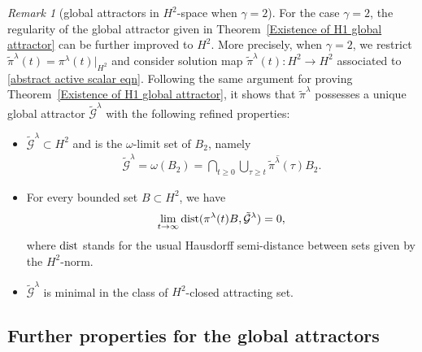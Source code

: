 \documentclass[reqno]{amsart}%
\theoremstyle{definition}
\theoremstyle{remark}
\numberwithin{equation}{section}
\newtheorem{remark}[theorem]{Remark}
\newcommand{\1}{\mathbf{1}}
\newcommand{\pin}{\pi^{\lambda}}
\newcommand{\dist}{\text{\rm dist}}
\numberwithin{equation}{section}
\numberwithin{theorem}{section}
\numberwithin{figure}{section}
\begin{document}
\begin{remark}[global attractors in $H^2$-space when $\gamma=2$]\label{H2 global attractor rem}
For the case $\gamma=2$, the regularity of the global attractor given in Theorem~\ref{Existence of H1 global attractor} can be further improved to $H^2$. More precisely, when $\gamma=2$, we restrict $\tilde{\pi}^\lambda(t)=\pin(t)\Big|_{H^2}$ and consider solution map $\tilde{\pi}^\lambda(t):H^2\to H^2$ associated to \eqref{abstract active scalar eqn}. Following the same argument for proving Theorem~\ref{Existence of H1 global attractor}, it shows that $\tilde{\pi}^\lambda$ possesses a unique global attractor $\tilde{\mathcal{G}}^\lambda$ with the following refined properties:
\begin{itemize}
\item $\tilde{\mathcal{G}}^\lambda\subset H^2$ and is the $\omega$-limit set of $B_{2}$, namely
\begin{align*}
\tilde{\mathcal{G}}^\lambda=\omega(B_{2})=\bigcap_{t\ge0}\overline{\bigcup_{\tau\ge t}\tilde{\pi}^\lambda(\tau) B_{2}}.
\end{align*}
\item For every bounded set $B\subset H^2$, we have
\begin{align*}
\lim_{t\to\infty}\dist(\pin(t)B,\tilde{\mathcal{G}}^\lambda)=0,
\end{align*}
where $\dist$ stands for the usual Hausdorff semi-distance between sets given by the $H^2$-norm.
\item $\tilde{\mathcal{G}}^\lambda$ is minimal in the class of $H^2$-closed attracting set.
\end{itemize}
\end{remark}

\subsection{Further properties for the global attractors}\label{Further properties for the attractors subsection}
\end{document}
